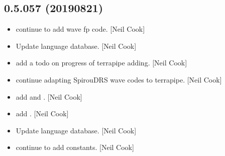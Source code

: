 \documentclass[a4paper,10pt,english]{report}
\begin{document}
\subsection{0.5.057 (2019\sphinxhyphen{}08\sphinxhyphen{}21)}
\label{\detokenize{misc/changelog:id104}}\begin{itemize}
\item {} 
 \sphinxhyphen{} continue to add wave fp code. {[}Neil Cook{]}

\item {} 
Update language database. {[}Neil Cook{]}

\item {} 
 \sphinxhyphen{} add a todo on progress of terrapipe adding. {[}Neil
Cook{]}

\item {} 
 \sphinxhyphen{} continue adapting SpirouDRS wave codes to
terrapipe. {[}Neil Cook{]}

\item {} 
 \sphinxhyphen{} add   and
. {[}Neil Cook{]}

\item {} 
 \sphinxhyphen{} add . {[}Neil Cook{]}

\item {} 
Update language database. {[}Neil Cook{]}

\item {} 
 \sphinxhyphen{} continue to add  constants. {[}Neil Cook{]}

\end{itemize}
\end{document}
